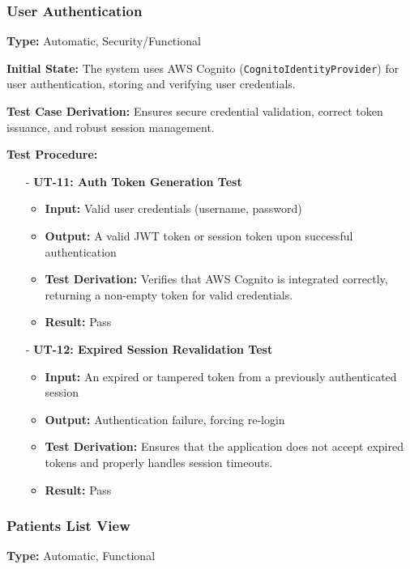 \documentclass[12pt, titlepage]{article}
\begin{document}
\subsubsection{User Authentication}
\textbf{Type:} Automatic, Security/Functional
\vspace{10pt}

\noindent \textbf{Initial State:}
The system uses AWS Cognito (\texttt{CognitoIdentityProvider}) for user authentication, storing and verifying user credentials.
\vspace{10pt}

\noindent \textbf{Test Case Derivation:}
Ensures secure credential validation, correct token issuance, and robust session management.
\vspace{10pt}

\noindent \textbf{Test Procedure:}
\begin{itemize}
   \item[-] \textbf{UT-11: Auth Token Generation Test} \label{test:userauth-token}
   \begin{itemize}
     \item \textbf{Input:} Valid user credentials (username, password)
     \item \textbf{Output:} A valid JWT token or session token upon successful authentication
     \item \textbf{Test Derivation:} Verifies that AWS Cognito is integrated correctly, returning a non-empty token for valid credentials.
     \item \textbf{Result:} Pass
   \end{itemize}

   \item[-] \textbf{UT-12: Expired Session Revalidation Test} \label{test:userauth-expired-session}
   \begin{itemize}
     \item \textbf{Input:} An expired or tampered token from a previously authenticated session
     \item \textbf{Output:} Authentication failure, forcing re-login
     \item \textbf{Test Derivation:} Ensures that the application does not accept expired tokens and properly handles session timeouts.
     \item \textbf{Result:} Pass
   \end{itemize}
\end{itemize}


\subsubsection{Patients List View}
\textbf{Type:} Automatic, Functional
\vspace{10pt}
\end{document}

